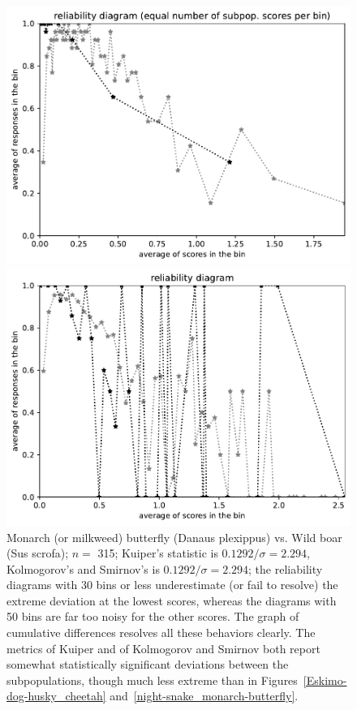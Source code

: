 \documentclass{article}
\newlength{\imsize}
\begin{document}
\begin{figure}
\begin{centering}
\parbox{\imsize}{\includegraphics[width=\imsize]
{../codes/unweighted/nll-1-323-monarch-monarch-butterfly-milkweed-butterfly-Danaus-plexippus_342-wild-boar-boar-Sus-scrofaequisamps50.pdf}}
\quad\quad
\parbox{\imsize}{\includegraphics[width=\imsize]
{../codes/unweighted/nll-1-323-monarch-monarch-butterfly-milkweed-butterfly-Danaus-plexippus_342-wild-boar-boar-Sus-scrofaequiscore50.pdf}}

\end{centering}
\caption{Monarch (or milkweed) butterfly (Danaus plexippus) vs.
         Wild boar (Sus scrofa); $n =$ 315;
         Kuiper's statistic is $0.1292 / \sigma = 2.294$,
         Kolmogorov's and Smirnov's is $0.1292 / \sigma = 2.294$;
         the reliability diagrams with 30 bins or less
         underestimate (or fail to resolve) the extreme deviation
         at the lowest scores, whereas the diagrams with 50 bins
         are far too noisy for the other scores.
         The graph of cumulative differences resolves
         all these behaviors clearly.
         The metrics of Kuiper and of Kolmogorov and Smirnov both report
         somewhat statistically significant deviations
         between the subpopulations, though much less extreme than in
         Figures~\ref{Eskimo-dog-husky_cheetah}
         and~\ref{night-snake_monarch-butterfly}.
}
\label{monarch-butterfly_wild-boar}
\end{figure}
\end{document}
